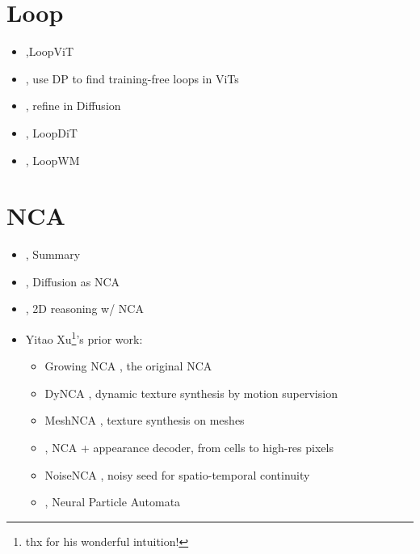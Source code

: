 \section{Loop}
\begin{itemize}
    \item \cite{shu2026loopvit},LoopViT
    \item \cite{jacobs2025blockrecurrent}, use DP to find  training-free loops in ViTs
    \item \cite{goyal2026elt}, refine in Diffusion
    \item \cite{chng2026looped}, LoopDiT
    \item \cite{lu2026looped}, LoopWM
\end{itemize}
\section{NCA}
\begin{itemize}
    \item \cite{spitznagel2026new}, Summary
    \item \cite{drozdova2026diffusion}, Diffusion as NCA 
    \item \cite{spitznagel20262d,etcheverry2026reasoning}, 2D reasoning w/ NCA
    \item Yitao Xu\footnote{thx  for his wonderful intuition!}'s prior work:
    \begin{itemize}
        \item Growing NCA \cite{mordvintsev2020growing}, the original NCA
        \item DyNCA \cite{pajouheshgar2023dynca}, dynamic texture synthesis by motion supervision
        \item MeshNCA \cite{pajouheshgar2024meshnca}, texture synthesis on meshes
        \item \cite{pajouheshgar2025neural}, NCA + appearance decoder, from cells to high-res pixels
        \item NoiseNCA \cite{pajouheshgar2024noisenca}, noisy seed for spatio-temporal continuity
        \item \cite{kim2026neural}, Neural Particle Automata
    \end{itemize}
\end{itemize}
